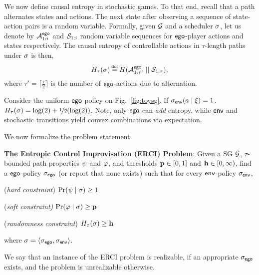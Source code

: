 {{{We now define causal entropy in stochastic games.
To that end, recall that a path alternates states and actions.  The
next state after observing a sequence of state-action pairs is a
random variable. Formally, given $\mathcal{G}$ and a scheduler 
$\sigma$, let us denote by ${\mathcal{A}}^{\mathsf{ego}}_{1:i}$ and
${\mathcal{S}}_{1:i}$ random variable sequences for
$\mathsf{ego}$-player actions and states respectively. The causal entropy of
controllable actions in $\tau$-length paths under $\sigma$ is then,
\begin{equation}
  H_\tau(\sigma) \eqdef H( \rv{A}^{\pOne}_{1:\tau'} \mid\mid \rv{S}_{1:\tau} ),
\end{equation}
where $\tau' = \lceil \frac{\tau}{2}\rceil$ is the number of $\mathsf{ego}$-actions due to alternation.



\begin{example}
  Consider the uniform $\mathsf{ego}$ policy on Fig.~\ref{fig:toysg}. If $\sigma_{\mathsf{env}}(a\mid \xi) = 1$. $H_\tau(\sigma) = \log(2) + \nicefrac{1}{2}(\log(2))$. Note, only $\mathsf{ego}$ can \emph{add} entropy, while $\mathsf{env}$ and stochastic transitions yield convex combinations via expectation.
\end{example}

\noindent
We now formalize the problem statement. 
\begin{mdframed}[backgroundcolor=blue!5,nobreak=true]
\textbf{The Entropic Control Improvisation (ERCI) Problem}:
Given a SG $\mathcal{G}$, $\tau$-bounded path properties $\psi$ and $\varphi$, and thresholds $\mathbf{p} \in [0,1]$ and $\mathbf{h} \in [0,\infty)$, find a $\mathsf{ego}$-policy ${\sigma_{\mathsf{ego}}}$ (or report that none exists) such that for every $\mathsf{env}$-policy ${\sigma_{\mathsf{env}}}$,
\begin{compactenum}
	\item (\emph{hard constraint}) $\Pr(\psi \mid \sigma) \geq 1$
	\item (\emph{soft constraint)} $\Pr(\varphi \mid \sigma) \geq \mathbf{p}$
\item (\emph{randomness constraint}) $H_\tau(\sigma) \geq \mathbf{h}$
\end{compactenum}
where  $\sigma = \langle {\sigma_{\mathsf{ego}}}, {\sigma_{\mathsf{env}}} \rangle$.
\end{mdframed}
We say that an instance of the ERCI problem is realizable, if an appropriate ${\sigma_{\mathsf{ego}}}$ exists, and the problem is unrealizable otherwise.



}}}
